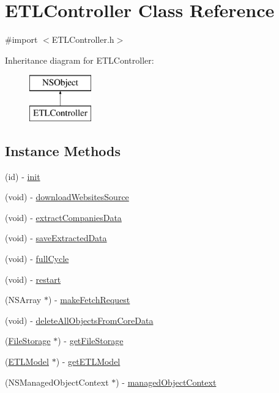 \hypertarget{interface_e_t_l_controller}{\section{E\-T\-L\-Controller Class Reference}
\label{interface_e_t_l_controller}
}


{\ttfamily \#import $<$E\-T\-L\-Controller.\-h$>$}

Inheritance diagram for E\-T\-L\-Controller\-:\begin{figure}[H]
\begin{center}
\leavevmode
\includegraphics[height=2.000000cm]{interface_e_t_l_controller}
\end{center}
\end{figure}
\subsection*{Instance Methods}
\begin{DoxyCompactItemize}
\item 
(id) -\/ \hyperlink{interface_e_t_l_controller_ae5233775bf3fee045da190b47047e3ba}{init}
\item 
(void) -\/ \hyperlink{interface_e_t_l_controller_a99fab8d1a22d38740f68735f51738a33}{download\-Websites\-Source}
\item 
(void) -\/ \hyperlink{interface_e_t_l_controller_af0200de320ea259f1de2c0f9374a9ac1}{extract\-Companies\-Data}
\item 
(void) -\/ \hyperlink{interface_e_t_l_controller_ac878f448a9cb6dd16e1bc2711ef00dac}{save\-Extracted\-Data}
\item 
(void) -\/ \hyperlink{interface_e_t_l_controller_a4879e583e1953a35ea2d76b88f1687d4}{full\-Cycle}
\item 
(void) -\/ \hyperlink{interface_e_t_l_controller_a7c75c7e5a47e61674653f74a7a6c857d}{restart}
\item 
(N\-S\-Array $\ast$) -\/ \hyperlink{interface_e_t_l_controller_af6a24d13d424e4a3bcc46d0d0dbb4bb3}{make\-Fetch\-Request}
\item 
(void) -\/ \hyperlink{interface_e_t_l_controller_aaf40c3fa151c7ae477ca0ae5e7e74621}{delete\-All\-Objects\-From\-Core\-Data}
\item 
(\hyperlink{interface_file_storage}{File\-Storage} $\ast$) -\/ \hyperlink{interface_e_t_l_controller_a468a71240cc00d11d171cb35ea267a57}{get\-File\-Storage}
\item 
(\hyperlink{interface_e_t_l_model}{E\-T\-L\-Model} $\ast$) -\/ \hyperlink{interface_e_t_l_controller_aca58bfc86c0fe05a8cfab25986e6dffd}{get\-E\-T\-L\-Model}
\item 
(N\-S\-Managed\-Object\-Context $\ast$) -\/ \hyperlink{interface_e_t_l_controller_a2f0c53ef147166dad789da138f2d0f1f}{managed\-Object\-Context}
\end{DoxyCompactItemize}
